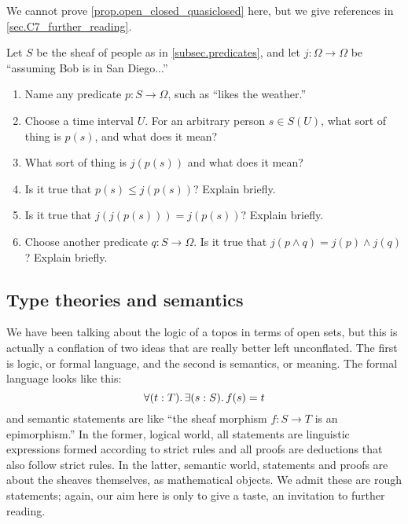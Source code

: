 \documentclass[7Sketches]{subfiles}
\begin{document}
We cannot prove \cref{prop.open_closed_quasiclosed} here, but we give references in \cref{sec.C7_further_reading}.

\begin{exercise}%
\label{exc.check_modality}
Let $S$ be the sheaf of people as in \cref{subsec.predicates}, and let $j\colon\Omega\to\Omega$ be ``assuming Bob is in San Diego...'' 
\begin{enumerate}
	\item Name any predicate $p\colon S\to\Omega$, such as ``likes the weather.''
	\item Choose a time interval $U$. For an arbitrary person $s\in S(U)$, what sort of thing is $p(s)$, and what does it mean?
	\item What sort of thing is $j(p(s))$ and what does it mean?
	\item Is it true that $p(s)\leq j(p(s))$? Explain briefly.
	\item Is it true that $j(j(p(s)))=j(p(s))$? Explain briefly.
	\item Choose another predicate $q\colon S\to\Omega$. Is it true that $j(p\wedge q)=j(p)\wedge j(q)$? Explain briefly.
\qedhere
\end{enumerate}
\end{exercise}

%

\subsection{Type theories and semantics}
%
\label{subsec.type_th_and_semantics}%
%

We have been talking about the logic of a topos in terms of open sets, but this is actually a conflation of two ideas that are really better left unconflated. The first is logic, or formal language, and the second is semantics, or meaning. The formal language looks like this:
\begin{equation}%
\label{eqn.logic_surjective}
	\forall(t:T)\ldotp\exists(s:S)\ldotp f(s)=t
\end{equation}
and semantic statements are like ``the sheaf morphism $f\colon S\to T$ is an
epimorphism.'' In the former, logical world, all statements are linguistic expressions formed according to strict
rules and all proofs are deductions that also follow strict rules. In the
latter, semantic world, statements and proofs are about the sheaves themselves, as mathematical objects. We admit these are rough
statements; again, our aim here is only to give a taste, an invitation to further reading.
\end{document}
